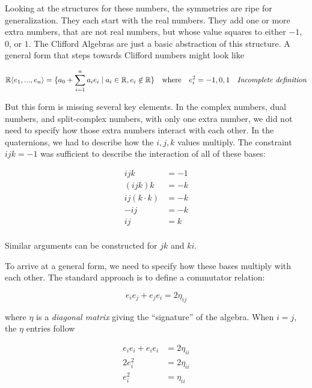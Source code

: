 \documentclass[8pt]{article}
\begin{document}
Looking at the structures for these numbers, the symmetries are ripe for generalization. They each start with the real numbers. They add one or more extra numbers, that are not real numbers, but whose value squares to either $-1$, $0$, or $1$. The Clifford Algebras are just a basic abstraction of this structure. A general form that steps towards Clifford numbers might look like

\[
  \mathbb{R}\langle e_1,...,e_n \rangle = \{ a_0 + \sum\limits_{i = 1}^{n} a_i e_i \mid a_i \in \mathbb{R}, e_i \notin \mathbb{R} \} \quad \text{where} \quad e_i^2 = {-1, 0, 1} \quad \text{\emph{Incomplete definition}}
\]

But this form is missing several key elements. In the complex numbers, dual numbers, and split-complex numbers, with only one extra number, we did not need to specify how those extra numbers interact with each other. In the quaternions, we had to describe how the $i,j,k$ values multiply. The constraint $ijk = -1$ was sufficient to describe the interaction of all of these bases:

\begin{equation}
  \begin{aligned}
    ijk &= -1 \\
    (ijk)k &= -k \\
    ij(k \cdot k) & = -k \\
    -ij &= -k \\
    ij &= k \\
  \end{aligned}
\end{equation}

Similar arguments can be constructed for $jk$ and $ki$.

To arrive at a general form, we need to specify how these bases multiply with each other. The standard approach is to define a commutator relation:

\[
  e_i e_j + e_j e_i = 2\eta_{ij}
\]

where $\eta$ is a \emph{diagonal matrix} giving the ``signature'' of the algebra. When $i=j$, the $\eta$ entries follow

\begin{equation}
  \begin{aligned}
    e_i e_i + e_i e_i &= 2 \eta_{ii} \\
    2 e_i^2 &= 2 \eta_{ii} \\
    e_i^2 &= \eta_{ii} \\
  \end{aligned}
\end{equation}
\end{document}
